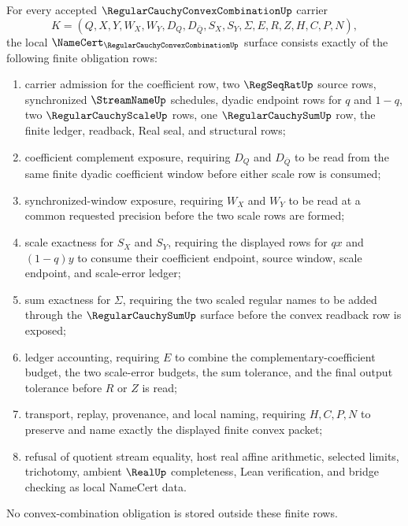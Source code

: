 \begin{theorem}
\label{thm:regular-cauchy-convex-combination-namecert-obligations}
For every accepted $\RegularCauchyConvexCombinationUp$ carrier
$$
K=(Q,X,Y,W_X,W_Y,D_Q,D_{\bar Q},S_X,S_Y,\Sigma,E,R,Z,H,C,P,N),
$$
the local $\NameCert_{\RegularCauchyConvexCombinationUp}$ surface consists exactly of the following finite obligation rows:
\begin{enumerate}
\item carrier admission for the coefficient row, two $\RegSeqRatUp$ source rows, synchronized $\StreamNameUp$ schedules, dyadic endpoint rows for $q$ and $1-q$, two $\RegularCauchyScaleUp$ rows, one $\RegularCauchySumUp$ row, the finite ledger, readback, Real seal, and structural rows;
\item coefficient complement exposure, requiring $D_Q$ and $D_{\bar Q}$ to be read from the same finite dyadic coefficient window before either scale row is consumed;
\item synchronized-window exposure, requiring $W_X$ and $W_Y$ to be read at a common requested precision before the two scale rows are formed;
\item scale exactness for $S_X$ and $S_Y$, requiring the displayed rows for $q x$ and $(1-q)y$ to consume their coefficient endpoint, source window, scale endpoint, and scale-error ledger;
\item sum exactness for $\Sigma$, requiring the two scaled regular names to be added through the $\RegularCauchySumUp$ surface before the convex readback row is exposed;
\item ledger accounting, requiring $E$ to combine the complementary-coefficient budget, the two scale-error budgets, the sum tolerance, and the final output tolerance before $R$ or $Z$ is read;
\item transport, replay, provenance, and local naming, requiring $H,C,P,N$ to preserve and name exactly the displayed finite convex packet;
\item refusal of quotient stream equality, host real affine arithmetic, selected limits, trichotomy, ambient $\RealUp$ completeness, Lean verification, and bridge checking as local NameCert data.
\end{enumerate}
No convex-combination obligation is stored outside these finite rows.
\end{theorem}
